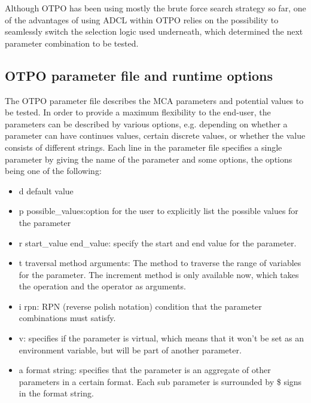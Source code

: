 Although OTPO has been using mostly the brute force search strategy so far, one of the advantages of using ADCL within OTPO relies on the possibility to seamlessly switch the selection logic used underneath, which determined the next parameter combination to be tested.



\subsection{OTPO parameter file and runtime options}

The OTPO parameter file describes the MCA parameters and potential values to be tested. In order to provide a maximum flexibility to the end-user, the parameters can be described by various options, e.g. depending on whether a parameter can have continues values, certain discrete values, or whether the value consists of different strings. Each line in the parameter file specifies a single parameter by giving the name of the parameter and some options, the options being one of the following:
\begin{itemize}
\item d default value
\item p {possible\_values}:option for the user to explicitly list the possible
  values for the parameter
\item r start\_value end\_value: specify the start and end value for the
  parameter.
\item t traversal method arguments: The method to traverse the range of
  variables for the parameter. The increment method is only available now,
  which takes the operation and the operator as arguments.
\item i rpn: RPN (reverse polish notation) condition that the parameter
  combinations must satisfy.
\item v: specifies if the parameter is virtual, which means that it won't be
  set as an environment variable, but will be part of another parameter.
\item a {format string}: specifies that the parameter is an aggregate of
  other parameters in a certain format. Each sub parameter is surrounded by \$
  signs in the format string.
\end{itemize}

